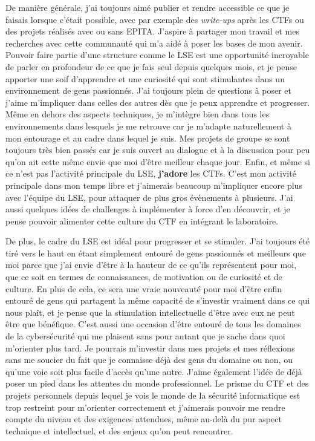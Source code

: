 \documentclass[a4paper, 11pt]{article}
\begin{document}
    De manière générale, j’ai toujours aimé publier et rendre accessible ce que je faisais lorsque c’était possible, avec par exemple des \emph{write-ups} après les CTFs ou des projets réalisés avec ou sans EPITA. J’aspire à partager mon travail et mes recherches avec cette communauté qui m’a aidé à poser les bases de mon avenir. Pouvoir faire partie d’une structure comme le LSE est une opportunité incroyable de parler en profondeur de ce que je fais seul depuis quelques mois, et je pense apporter une soif d’apprendre et une curiosité qui sont stimulantes dans un environnement de gens passionnés. J’ai toujours plein de questions à poser et j’aime m’impliquer dans celles des autres dès que je peux apprendre et progresser. Même en dehors des aspects techniques, je m’intègre bien dans tous les environnements dans lesquels je me retrouve car je m’adapte naturellement à mon entourage et au cadre dans lequel je suis. Mes projets de groupe se sont toujours très bien passés car je suis ouvert au dialogue et à la discussion pour peu qu’on ait cette même envie que moi d’être meilleur chaque jour. Enfin, et même si ce n’est pas l’activité principale du LSE, \textbf{j’adore} les CTFs. C’est mon activité principale dans mon temps libre et j’aimerais beaucoup m’impliquer encore plus avec l’équipe du LSE, pour attaquer de plus gros évènements à plusieurs. J’ai aussi quelques idées de challenges à implémenter à force d’en découvrir, et je pense pouvoir alimenter cette culture du CTF en intégrant le laboratoire.

    De plus, le cadre du LSE est idéal pour progresser et se stimuler. J’ai toujours été tiré vers le haut en étant simplement entouré de gens passionnés et meilleurs que moi parce que j’ai envie d’être à la hauteur de ce qu’ils représentent pour moi, que ce soit en termes de connaissances, de motivation ou de curiosité et de culture. En plus de cela, ce sera une vraie nouveauté pour moi d’être enfin entouré de gens qui partagent la même capacité de s’investir vraiment dans ce qui nous plaît, et je pense que la stimulation intellectuelle d’être avec eux ne peut être que bénéfique. C’est aussi une occasion d’être entouré de tous les domaines de la cybersécurité qui me plaisent sans pour autant que je sache dans quoi m’orienter plus tard. Je pourrais m’investir dans mes projets et mes réflexions sans me soucier du fait que je connaisse déjà des gens du domaine ou non, ou qu’une voie soit plus facile d’accès qu’une autre. J’aime également l’idée de déjà poser un pied dans les attentes du monde professionnel. Le prisme du CTF et des projets personnels depuis lequel je vois le monde de la sécurité informatique est trop restreint pour m’orienter correctement et j’aimerais pouvoir me rendre compte du niveau et des exigences attendues, même au-delà du pur aspect technique et intellectuel, et des enjeux qu'on peut rencontrer.
\end{document}
